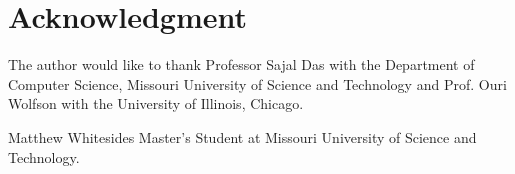 \documentclass[journal,onecolumn]{IEEEtran}
\begin{document}



\section*{Acknowledgment}
The author would like to thank Professor Sajal Das with the Department of Computer Science, Missouri University of Science and Technology and Prof. Ouri Wolfson with the University of Illinois, Chicago.

\ifCLASSOPTIONcaptionsoff
  \newpage
\fi




\begin{IEEEbiographynophoto}{Matthew Whitesides}
  Master's Student at Missouri University of Science and Technology.
\end{IEEEbiographynophoto}

\end{document}
